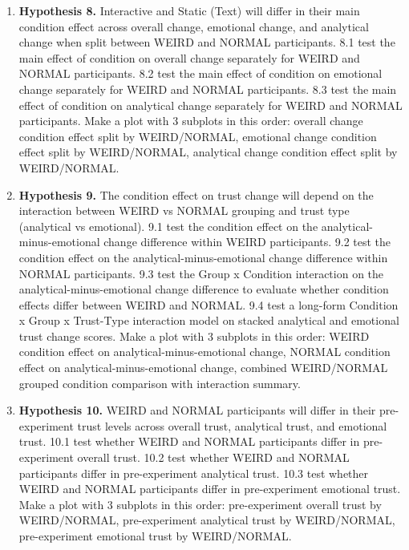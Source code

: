 \begin{enumerate}
7.3 test the main effect of condition on analytical change alone.
Make a plot with 3 subplots in this order: overall change condition effect, emotional change condition effect, analytical change condition effect.
\item \textbf{Hypothesis 8.} Interactive and Static (Text) will differ in their main condition effect across overall change, emotional change, and analytical change when split between WEIRD and NORMAL participants.
8.1 test the main effect of condition on overall change separately for WEIRD and NORMAL participants.
8.2 test the main effect of condition on emotional change separately for WEIRD and NORMAL participants.
8.3 test the main effect of condition on analytical change separately for WEIRD and NORMAL participants.
Make a plot with 3 subplots in this order: overall change condition effect split by WEIRD/NORMAL, emotional change condition effect split by WEIRD/NORMAL, analytical change condition effect split by WEIRD/NORMAL.
\item \textbf{Hypothesis 9.} The condition effect on trust change will depend on the interaction between WEIRD vs NORMAL grouping and trust type (analytical vs emotional).
9.1 test the condition effect on the analytical-minus-emotional change difference within WEIRD participants.
9.2 test the condition effect on the analytical-minus-emotional change difference within NORMAL participants.
9.3 test the Group x Condition interaction on the analytical-minus-emotional change difference to evaluate whether condition effects differ between WEIRD and NORMAL.
9.4 test a long-form Condition x Group x Trust-Type interaction model on stacked analytical and emotional trust change scores.
Make a plot with 3 subplots in this order: WEIRD condition effect on analytical-minus-emotional change, NORMAL condition effect on analytical-minus-emotional change, combined WEIRD/NORMAL grouped condition comparison with interaction summary.
\item \textbf{Hypothesis 10.} WEIRD and NORMAL participants will differ in their pre-experiment trust levels across overall trust, analytical trust, and emotional trust.
10.1 test whether WEIRD and NORMAL participants differ in pre-experiment overall trust.
10.2 test whether WEIRD and NORMAL participants differ in pre-experiment analytical trust.
10.3 test whether WEIRD and NORMAL participants differ in pre-experiment emotional trust.
Make a plot with 3 subplots in this order: pre-experiment overall trust by WEIRD/NORMAL, pre-experiment analytical trust by WEIRD/NORMAL, pre-experiment emotional trust by WEIRD/NORMAL.

\end{enumerate}
